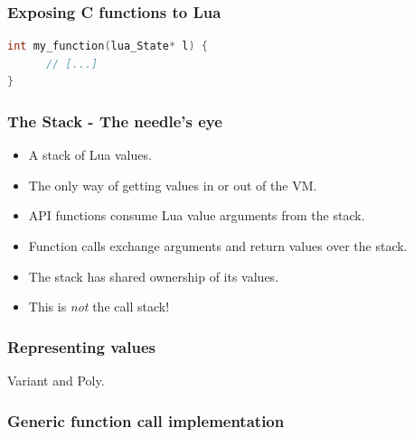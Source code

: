 \documentclass{beamer}
\newif\iftransitions
\begin{document}
\begin{frame}[fragile]
  \frametitle{Exposing C functions to Lua}

  \begin{lstlisting}[language={C++}]
int my_function(lua_State* l) {
      // [...]
}
  \end{lstlisting}
  
\end{frame}

\begin{frame}

  \frametitle{The Stack - The needle's eye}

  \begin{itemize}
  \item A stack of Lua values.
  \item The only way of getting values in or out of the VM.
  \item API functions consume Lua value arguments from the stack.
  \item Function calls exchange arguments and return values over the stack.
  \item The stack has shared ownership of its values.

  \item This is \emph{not} the call stack!
  \end{itemize}

\end{frame}


\begin{frame}

  \frametitle{Representing values}

  Variant and Poly.

\end{frame}


\begin{frame}

  \frametitle{Generic function call implementation}

\end{frame}

\iftransitions

\end{document}

